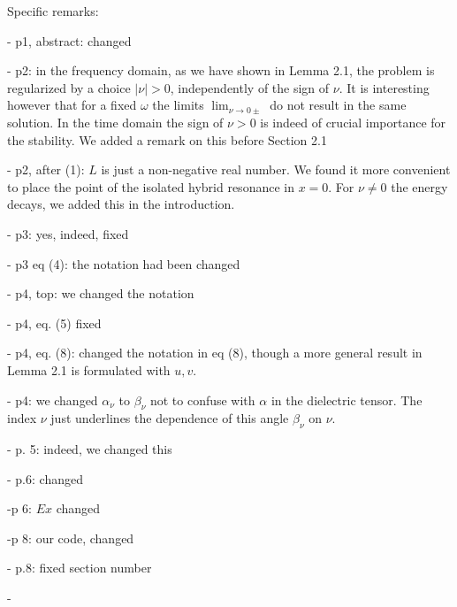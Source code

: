 \documentclass[a4paper,10pt]{article}
\begin{document}
Specific remarks: 

- p1, abstract: changed

- p2: in the frequency domain, as we have shown in Lemma 2.1, the problem is regularized by a choice $|\nu|>0$, independently of the sign of $\nu$. 
It is interesting however that for a fixed $\omega$ the limits $\lim_{\nu\rightarrow 0\pm}$ do not result in the same solution. 
In the time domain the sign of $\nu>0$ is indeed of crucial importance for the stability. We added a remark on this before Section 2.1  

- p2, after (1): $L$ is just a non-negative real number. We found it more convenient to place the point of the isolated hybrid resonance in $x=0$.
For $\nu\neq 0$ the energy decays, we added this in the introduction.


- p3: yes, indeed, fixed

- p3 eq (4): the notation had been changed
  
- p4, top: we changed the notation 

- p4, eq. (5) fixed

- p4, eq. (8): changed the notation in eq (8), though a more general result in Lemma 2.1 is formulated with $u,v$. 

- p4: we changed $\alpha_{\nu}$ to $\beta_{\nu}$ not to confuse with $\alpha$ in the dielectric tensor. The index $\nu$ 
just underlines the dependence of this angle $\beta_{\nu}$ on $\nu$.

- p. 5: indeed, we changed this 

- p.6:  changed

-p 6: $Ex$ changed

-p 8: our code, changed

 - p.8: fixed section number
 
 - 

  
 
\end{document}
